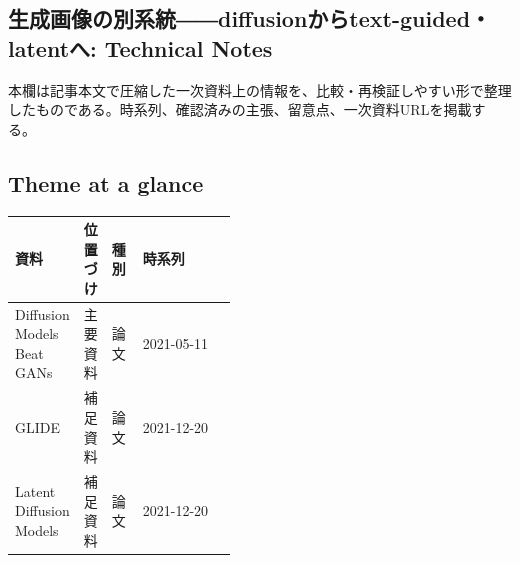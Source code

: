 \subsection*{生成画像の別系統――diffusionからtext-guided・latentへ: Technical Notes}
本欄は記事本文で圧縮した一次資料上の情報を、比較・再検証しやすい形で整理したものである。時系列、確認済みの主張、留意点、一次資料URLを掲載する。
\smallskip
{}\par
\medskip
\subsection*{Theme at a glance}
\begin{center}
\footnotesize
\begin{tabularx}{\linewidth}{@{}p{0.20\linewidth}p{0.10\linewidth}p{0.14\linewidth}X@{}}
\toprule
資料 & 位置づけ & 種別 & 時系列 \\
\midrule
Diffusion Models Beat GANs & 主要資料 & 論文 & 2021-05-11 \\
GLIDE & 補足資料 & 論文 & 2021-12-20 \\
Latent Diffusion Models & 補足資料 & 論文 & 2021-12-20 \\
\bottomrule
\end{tabularx}
\end{center}
\normalsize

